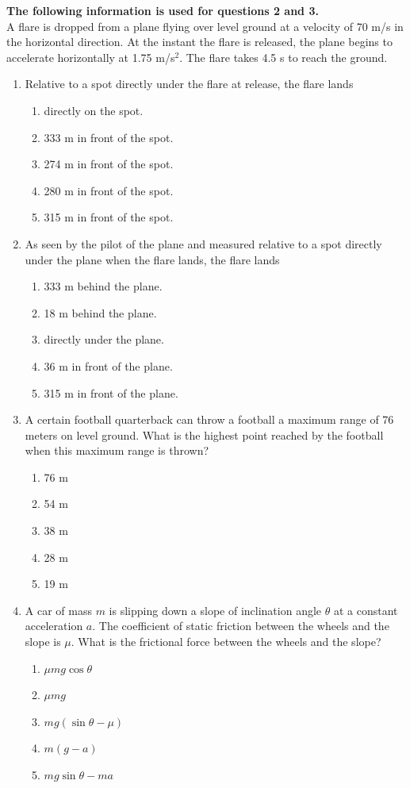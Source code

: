 \documentclass[12pt,letterpaper]{article}
\begin{document}
\textbf{The following information is used for questions 2 and 3.}\\
A flare is dropped from a plane flying over level ground at a velocity of 70 m/s in the horizontal direction. At the instant the flare is released, the plane begins to accelerate horizontally at 1.75 m/s$^2$. The flare takes 4.5 s to reach the ground.

\begin{enumerate}[resume]
\item
Relative to a spot directly under the flare at release, the flare lands
\begin{enumerate}
\item directly on the spot.
\item 333 m in front of the spot.
\item 274 m in front of the spot.
\item 280 m in front of the spot.
\item 315 m in front of the spot.
\end{enumerate}

\item
As seen by the pilot of the plane and measured relative to a spot directly under the plane when the flare lands, the flare lands
\begin{enumerate}
\item 333 m behind the plane.
\item 18 m behind the plane.
\item directly under the plane.
\item 36 m in front of the plane.
\item 315 m in front of the plane.
\end{enumerate}

\vfill
\newpage

\item
A certain football quarterback can throw a football a maximum range of 76 meters on level ground. What is the highest point reached by the football when this maximum range is thrown?
\begin{enumerate}
\item 76 m
\item 54 m
\item 38 m
\item 28 m
\item 19 m
\end{enumerate}

\item
A car of mass $m$ is slipping down a slope of inclination angle $\theta$ at a constant acceleration $a$. The coefficient of static friction between the wheels and the slope is $\mu$. What is the frictional force between the wheels and the slope?
\begin{enumerate}
\item $\mu mg\cos\theta$
\item $\mu mg$
\item $mg\left(\sin\theta-\mu\right)$
\item $m\left(g-a\right)$
\item $mg\sin\theta-ma$
\end{enumerate}


\end{enumerate}
\end{document}
